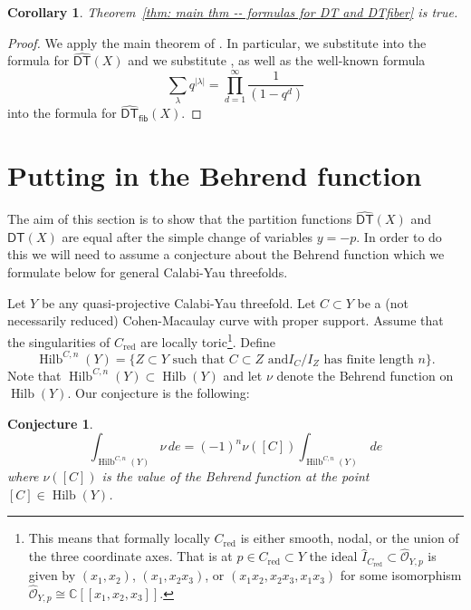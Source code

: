 \documentclass{amsart}
\newtheorem{conjecture}[theorem]{Conjecture}
\newtheorem{corollary}[theorem]{Corollary}
\theoremstyle{definition}
\newcommand{\CC} {\mathbb{C}}          %
\newcommand{\Hilb}{\operatorname{Hilb}}
\newcommand{\DT}{\mathsf{DT}}
\newcommand{\DThat}{\widehat{\DT}}
\newcommand{\fiber}{\mathsf{fib}}
\newcommand{\red}{\mathrm{red}}
\begin{document}
\begin{corollary}
Theorem~\ref{thm: main thm -- formulas for DT and DTfiber} is true.
\end{corollary}
\begin{proof}
We apply the main theorem of \cite{Bryan-Kool-Young}. In particular, we substitute
\cite[Eqns~(2)\&(4)]{Bryan-Kool-Young} into the formula for $\DThat (X)$ and we substitute
\cite[Eqn~(1)]{Bryan-Kool-Young}, as well as the well-known formula
\[
\sum_{\lambda}q^{|\lambda |} =\prod_{d=1}^{\infty}\frac{1}{(1-q^{d})}
\]
into the formula for $\DThat_{\fiber } (X)$.
\end{proof}

\section{Putting in the Behrend function} \label{sec: Behrend}

The aim of this section is to show that the partition functions
$\DThat (X)$ and $\DT (X)$ are equal after the simple change of
variables $y=-p$. In order to do this we will need to assume a
conjecture about the Behrend function which we formulate below for
general Calabi-Yau threefolds.

Let $Y$ be any quasi-projective Calabi-Yau
threefold.  Let $C\subset Y$ be a (not necessarily reduced)
Cohen-Macaulay curve with proper support. Assume that the
singularities of $C_{\red}$ are locally toric\footnote{This means that
formally locally $C_{\red}$ is either smooth, nodal, or the union of
the three coordinate axes. That is at $p\in C_{\red}\subset Y$ the
ideal $\widehat{I}_{C_{\red}}\subset \widehat{\mathcal{O}}_{Y,p}$ is
given by $(x_{1},x_{2})$, $(x_{1},x_{2}x_{3})$, or
$(x_{1}x_{2},x_{2}x_{3},x_{1}x_{3})$ for some isomorphism
$\widehat{\mathcal{O}}_{Y,p}\cong \CC
[[x_{1},x_{2},x_{3}]]$. }. Define\emph{
\[
\Hilb^{C,n}(Y) = \{Z\subset Y \text{ such that $C\subset Z$ and
$I_{C}/I_{Z}$ has finite length $n$} \}.
\]
}
Note that $\Hilb^{C,n}(Y)\subset \Hilb (Y)$ and let $\nu$ denote the
Behrend function on $\Hilb (Y)$. Our conjecture is the following:

\begin{conjecture}\label{conj: Behrend fnc conj}
\[
\int_{\Hilb^{C,n}(Y)} \nu \, de = (-1)^{n} \nu ([C]) \int_{\Hilb^{C,n}(Y)} \, de
\]
where $\nu ([C])$ is the value of the Behrend function at the point $[C]\in \Hilb (Y)$.
\end{conjecture}
\end{document}
